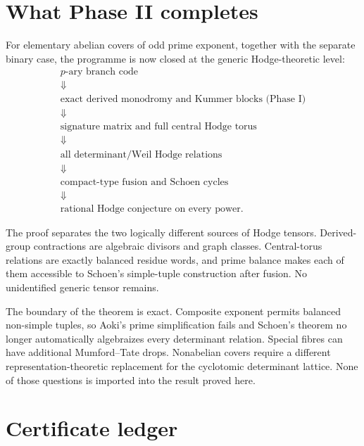 \documentclass[11pt]{article}
\theoremstyle{definition}
\theoremstyle{remark}
\begin{document}
\section{What Phase II completes}\label{sec:completion}

For elementary abelian covers of odd prime exponent, together with the separate binary case, the programme is now closed at the generic Hodge-theoretic level:
\[
 \boxed{
 \begin{array}{c}
 \text{$p$-ary branch code}\\[2pt]
 \Downarrow\\[-1pt]
 \text{exact derived monodromy and Kummer blocks (Phase I)}\\[2pt]
 \Downarrow\\[-1pt]
 \text{signature matrix and full central Hodge torus}\\[2pt]
 \Downarrow\\[-1pt]
 \text{all determinant/Weil Hodge relations}\\[2pt]
 \Downarrow\\[-1pt]
 \text{compact-type fusion and Schoen cycles}\\[2pt]
 \Downarrow\\[-1pt]
 \text{rational Hodge conjecture on every power.}
 \end{array}}
\]

The proof separates the two logically different sources of Hodge tensors.  Derived-group contractions are algebraic divisors and graph classes.  Central-torus relations are exactly balanced residue words, and prime balance makes each of them accessible to Schoen's simple-tuple construction after fusion.  No unidentified generic tensor remains.

The boundary of the theorem is exact.  Composite exponent permits balanced non-simple tuples, so Aoki's prime simplification fails and Schoen's theorem no longer automatically algebraizes every determinant relation.  Special fibres can have additional Mumford--Tate drops.  Nonabelian covers require a different representation-theoretic replacement for the cyclotomic determinant lattice.  None of those questions is imported into the result proved here.

\appendix
\section{Certificate ledger}
\end{document}
